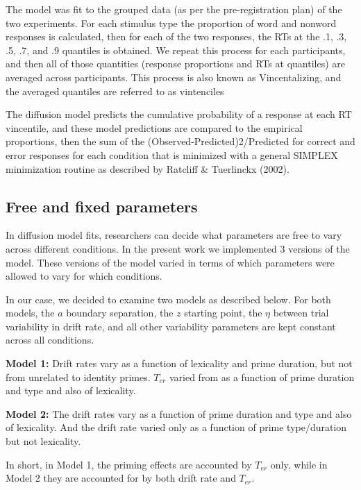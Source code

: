 \documentclass[
  english,
  man,floatsintext]{apa6}
\begin{document}
\begin{appendix}
The model was fit to the grouped data (as per the pre-registration plan)
of the two experiments. For each stimulus type the proportion of word
and nonword responses is calculated, then for each of the two responses,
the RTs at the .1, .3, .5, .7, and .9 quantiles is obtained. We repeat
this process for each participants, and then all of those quantities
(response proportions and RTs at quantiles) are averaged across
participants. This process is also known as Vincentalizing, and the
averaged quantiles are referred to as vintenciles

The diffusion model predicts the cumulative probability of a response at
each RT vincentile, and these model predictions are compared to the
empirical proportions, then the sum of the
(Observed-Predicted)2/Predicted for correct and error responses for each
condition that is minimized with a general SIMPLEX minimization routine
as described by Ratcliff \& Tuerlinckx (2002).

\hypertarget{free-and-fixed-parameters}{%
\subsection{Free and fixed parameters}\label{free-and-fixed-parameters}}

In diffusion model fits, researchers can decide what parameters are free
to vary across different conditions. In the present work we implemented
3 versions of the model. These versions of the model varied in terms of
which parameters were allowed to vary for which conditions.

In our case, we decided to examine two models as described below. For
both models, the \(a\) boundary separation, the \(z\) starting point,
the \(\eta\) between trial variability in drift rate, and all other
variability parameters are kept constant across all conditions.

\textbf{Model 1:} Drift rates vary as a function of lexicality and prime
duration, but not from unrelated to identity primes. \(T_{er}\) varied
from as a function of prime duration and type and also of lexicality.

\textbf{Model 2:} The drift rates vary as a function of prime duration
and type and also of lexicality. And the drift rate varied only as a
function of prime type/duration but not lexicality.

In short, in Model 1, the priming effects are accounted by \(T_{er}\)
only, while in Model 2 they are accounted for by both drift rate and
\(T_{er}\).


\end{appendix}
\end{document}
